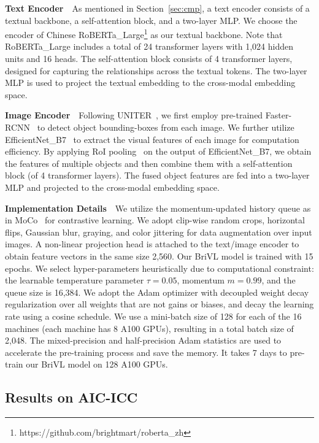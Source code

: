 \documentclass[10pt,twocolumn,letterpaper]{article}
\begin{document}
\noindent\textbf{Text Encoder}~~As mentioned in Section~\ref{sec:cmp}, a text encoder consists of a textual backbone, a self-attention block, and a two-layer MLP. We choose the encoder of Chinese RoBERTa\_Large\footnote{https://github.com/brightmart/roberta\_zh} as our textual backbone. Note that RoBERTa\_Large includes a total of 24 transformer layers with 1,024 hidden units and 16 heads. The self-attention block consists of 4 transformer layers, designed for capturing the relationships across the textual tokens. The two-layer MLP is used to project the textual embedding to the cross-modal embedding space.

\noindent\textbf{Image Encoder}~~Following UNITER~\cite{chen2020uniter}, we first employ pre-trained Faster-RCNN~\cite{ren2016faster} to detect object bounding-boxes from each image. We further utilize EfficientNet\_B7~\cite{tan2019efficientnet} to extract the visual features of each image for computation efficiency. By applying RoI pooling~\cite{girshick2015fast} on the output of EfficientNet\_B7, we obtain the features of multiple objects and then combine them with a self-attention block (of 4 transformer layers). The fused object features are fed into a two-layer MLP and projected to the cross-modal embedding space.

\noindent\textbf{Implementation Details}~~We utilize the momentum-updated history queue as in MoCo~\cite{he2020momentum} for contrastive learning.
We adopt clip-wise random crops, horizontal flips, Gaussian blur, graying, and color jittering for data augmentation over input images. A non-linear projection head is attached to the text/image encoder to obtain feature vectors in the same size 2,560. Our BriVL model is trained with 15 epochs. We select hyper-parameters heuristically due to computational constraint: the learnable temperature parameter $\tau = 0.05$, momentum $m = 0.99$, and the queue size is 16,384. We adopt the Adam optimizer with decoupled weight decay regularization over all weights that are not gains or biases, and decay the learning rate using a cosine schedule. We use a mini-batch size of 128 for each of the 16 machines (each machine has 8 A100 GPUs), resulting in a total batch size of 2,048. The mixed-precision and half-precision Adam statistics are used to accelerate the pre-training process and save the memory. It takes 7 days to pre-train our BriVL model on 128 A100 GPUs.

\subsection{Results on AIC-ICC}
\end{document}
